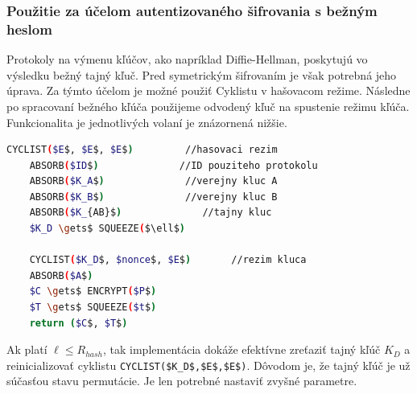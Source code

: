 \subsubsection{Použitie za účelom autentizovaného šifrovania s bežným heslom}
Protokoly na výmenu kľúčov, ako napríklad Diffie-Hellman, poskytujú vo výsledku bežný tajný kľuč. Pred symetrickým šifrovaním je však potrebná jeho úprava. Za týmto účelom je možné použiť Cyklistu v hašovacom režime. Následne po spracovaní bežného kľúča použijeme odvodený kľuč na spustenie režimu kľúča. Funkcionalita je jednotlivých volaní je znázornená nižšie. \newpage
\begin{lstlisting}[language=bash,mathescape=true]
	CYCLIST($E$, $E$, $E$)         //hasovaci rezim
	ABSORB($ID$)              //ID pouziteho protokolu
	ABSORB($K_A$)              //verejny kluc A
	ABSORB($K_B$)              //verejny kluc B 
	ABSORB($K_{AB}$)              //tajny kluc 
	$K_D \gets$ SQUEEZE($\ell$)
	
	CYCLIST($K_D$, $nonce$, $E$)       //rezim kluca
	ABSORB($A$)
	$C \gets$ ENCRYPT($P$)
	$T \gets$ SQUEEZE($t$)
	return ($C$, $T$)
\end{lstlisting} 
Ak platí $\ell \leq R_{hash}$, tak implementácia dokáže efektívne zreťaziť tajný kľúč $K_D$ a reinicializovať cyklistu \lstinline|CYCLIST($K_D$,$E$,$E$)|. Dôvodom je, že tajný kľúč je už súčasťou stavu permutácie. Je len potrebné nastaviť zvyšné parametre. 